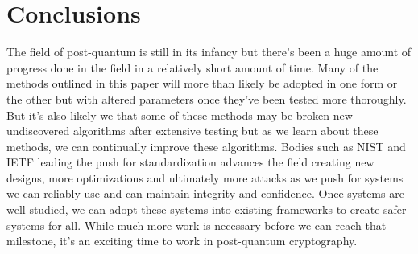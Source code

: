 \documentclass[10pt,a4paper]{IEEEtran}
\begin{document}
\section{Conclusions}

The field of post-quantum is still in its infancy but there's been a huge amount of progress done in the field in a relatively short amount of time. Many of the methods outlined in this paper will more than likely be adopted in one form or the other but with altered parameters once they've been tested more thoroughly. But it's also likely we that some of these methods may be broken new undiscovered algorithms after extensive testing but as we learn about these methods, we can continually improve these algorithms. Bodies such as NIST and IETF leading the push for standardization advances the field creating new designs, more optimizations and ultimately more attacks as we push for systems we can reliably use and can maintain integrity and confidence. Once systems are well studied, we can adopt these systems into existing frameworks to create safer systems for all. While much more work is necessary before we can reach that milestone, it's an exciting time to work in post-quantum cryptography. 
 

\end{document}

